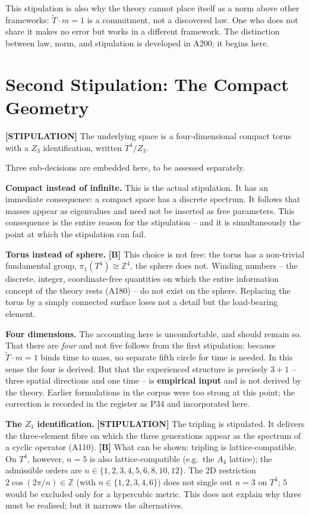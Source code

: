 This stipulation is also why the theory cannot place itself as a norm above
other frameworks: $\tilde T\cdot m = 1$ is a commitment, not a discovered
law. One who does not share it makes no error but works in a different
framework. The distinction between law, norm, and stipulation is developed
in A200; it begins here.

\section{Second Stipulation: The Compact Geometry}

\textbf{[STIPULATION]} The underlying space is a four-dimensional compact
torus with a $Z_3$ identification, written $T^4/Z_3$.

Three sub-decisions are embedded here, to be assessed separately.

\textbf{Compact instead of infinite.} This is the actual stipulation. It has
an immediate consequence: a compact space has a discrete spectrum. It follows
that masses appear as eigenvalues and need not be inserted as free parameters.
This consequence is the entire reason for the stipulation -- and it is
simultaneously the point at which the stipulation can fail.

\textbf{Torus instead of sphere.} \textbf{[B]} This choice is not free: the
torus has a non-trivial fundamental group, $\pi_1(T^4) \cong \mathbb{Z}^4$,
the sphere does not. Winding numbers -- the discrete, integer, coordinate-free
quantities on which the entire information concept of the theory rests (A180)
-- do not exist on the sphere. Replacing the torus by a simply connected
surface loses not a detail but the load-bearing element.

\textbf{Four dimensions.} The accounting here is uncomfortable, and should
remain so. That there are \emph{four} and not five follows from the first
stipulation: because $\tilde T\cdot m = 1$ binds time to mass, no separate
fifth circle for time is needed. In this sense the four is derived. But that
the experienced structure is precisely $3+1$ -- three spatial directions and
one time -- is \textbf{empirical input} and is not derived by the theory.
Earlier formulations in the corpus were too strong at this point; the
correction is recorded in the register as P34 and incorporated here.

\textbf{The $Z_3$ identification.} \textbf{[STIPULATION]} The tripling is
stipulated. It delivers the three-element fibre on which the three generations
appear as the spectrum of a cyclic operator (A110). \textbf{[B]} What can be
shown: tripling is lattice-compatible. On $T^4$, however, $n=5$ is also
lattice-compatible (e.g.\ the $A_4$ lattice); the admissible orders are
$n \in \{1,2,3,4,5,6,8,10,12\}$. The 2D restriction $2\cos(2\pi/n) \in \mathbb{Z}$
(with $n \in \{1,2,3,4,6\}$) does not single out $n=3$ on $T^4$; $5$ would be
excluded only for a hypercubic metric.
This does not explain why three must be realised; but it narrows the
alternatives.

